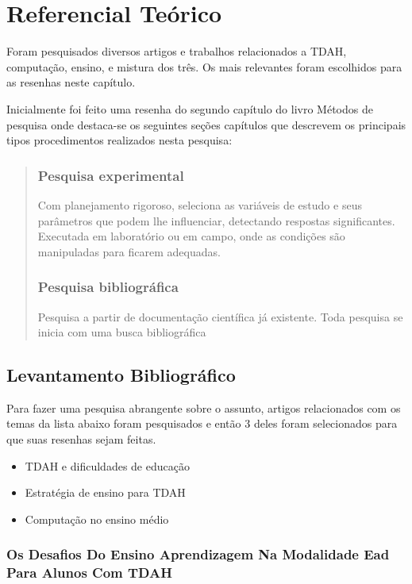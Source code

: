 \chapter{Referencial Teórico}

Foram pesquisados diversos artigos e trabalhos relacionados a TDAH, computação, ensino, e mistura dos três. Os mais relevantes foram escolhidos para as resenhas neste capítulo.

Inicialmente foi feito uma resenha do segundo capítulo do livro Métodos de pesquisa \cite{met_pesquisa} onde destaca-se os seguintes seções capítulos que descrevem os principais tipos procedimentos realizados nesta pesquisa:

\begin{quote}
\subsection*{Pesquisa experimental\label{sec:exp}}
Com planejamento rigoroso, seleciona as variáveis de estudo e seus parâmetros que podem lhe influenciar, detectando respostas significantes. Executada em laboratório ou em campo, onde as condições são manipuladas para ficarem adequadas.

\subsection*{Pesquisa bibliográfica\label{sec:bib}}
Pesquisa a partir de documentação científica já existente. Toda pesquisa se inicia com uma busca bibliográfica

\cite{met_pesquisa}
\end{quote}

\section{Levantamento Bibliográfico}

Para fazer uma pesquisa abrangente sobre o assunto, artigos relacionados com os temas da lista abaixo foram pesquisados e então 3 deles foram selecionados para que suas resenhas sejam feitas.

\begin{itemize}
    \item TDAH e dificuldades de educação
	\item Estratégia de ensino para TDAH
    \item Computação no ensino médio
\end{itemize}

\subsection{Os Desafios Do Ensino Aprendizagem Na Modalidade Ead Para Alunos Com TDAH}

